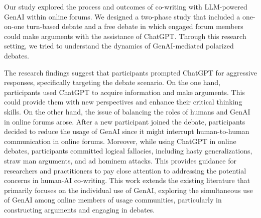Our study explored the process and outcomes of co-writing with LLM-powered GenAI within online forums. We designed a two-phase study that included a one-on-one turn-based debate and a free debate in which engaged forum members could make arguments with the assistance of ChatGPT. Through this research setting, we tried to understand the dynamics of GenAI-mediated polarized debates.

The research findings suggest that participants prompted ChatGPT for aggressive responses, specifically targeting the debate scenario. On the one hand, participants used ChatGPT to acquire information and make arguments. This could provide them with new perspectives and enhance their critical thinking skills. On the other hand, the issue of balancing the roles of humans and GenAI in online forums arose. After a new participant joined the debate, participants decided to reduce the usage of GenAI since it might interrupt human-to-human communication in online forums. Moreover, while using ChatGPT in online debates, participants committed logical fallacies, including hasty generalizations, straw man arguments, and ad hominem attacks. This provides guidance for researchers and practitioners to pay close attention to addressing the potential concerns in human-AI co-writing. This work extends the existing literature that primarily focuses on the individual use of GenAI, exploring the simultaneous use of GenAI among online members of usage communities, particularly in constructing arguments and engaging in debates.